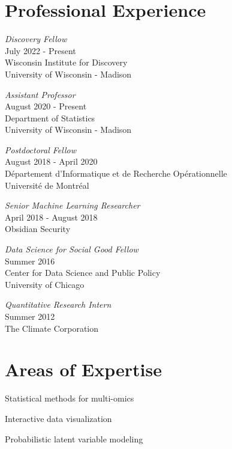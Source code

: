 \documentclass[letterpaper]{article}
\renewenvironment{itemize}{
  \begin{list}{}{
    \setlength{\leftmargin}{1.5em}
  }
}{
  \end{list}
}
\begin{document}
\section*{Professional Experience}
\begin{itemize}
\item \textit{Discovery Fellow} \\
July 2022 - Present \\
Wisconsin Institute for Discovery \\
University of Wisconsin - Madison

\item \textit{Assistant Professor}\\
August 2020 - Present \\
Department of Statistics \\
University of Wisconsin - Madison

\item \textit{Postdoctoral Fellow}\\
August 2018 - April 2020 \\
D\'epartement d'Informatique et de Recherche Op\'erationnelle \\
Universit\'e de Montr\'eal

\item \textit{Senior Machine Learning Researcher} \\
  April 2018 - August 2018 \\
  Obsidian Security
\item \textit{Data Science for Social Good Fellow} \\
  Summer 2016 \\
  Center for Data Science and Public Policy\\
  University of Chicago
\item \textit{Quantitative Research Intern} \\
  Summer 2012 \\
  The Climate Corporation
\end{itemize}

\section*{Areas of Expertise}
\begin{itemize}
  \item Statistical methods for multi-omics
  \item Interactive data visualization
  \item Probabilistic latent variable modeling
\end{itemize}
\end{document}
